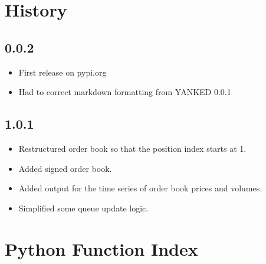\section{History}
\subsection{0.0.2} 
\begin{itemize}
	\item First release on pypi.org
	\item Had to correct markdown formatting from YANKED 0.0.1 
\end{itemize}

\subsection{1.0.1}
\begin{itemize}
	\item Restructured order book so that the position index starts at 1.
	\item Added signed order book.
	\item Added output for the time series of order book prices and volumes.
	\item Simplified some queue update logic. 
\end{itemize}
\newpage
\section{Python Function Index}
